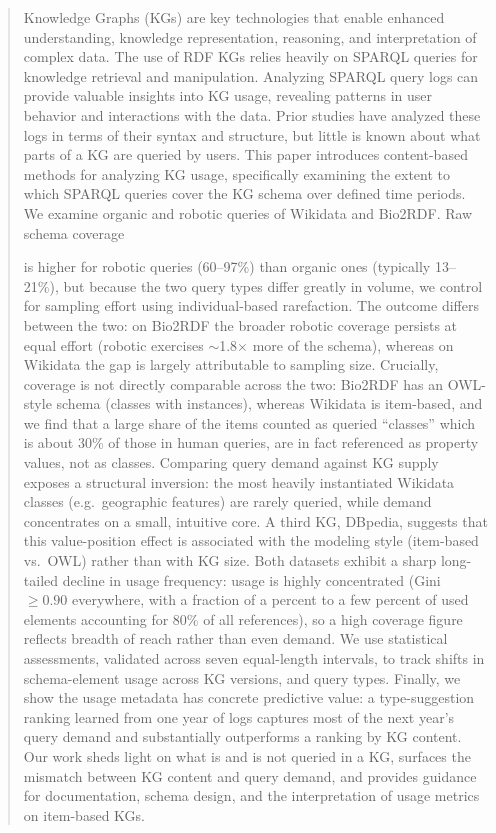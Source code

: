\documentclass[sw]{iosart2x}
\begin{document}
\begin{frontmatter}
\begin{abstract}
Knowledge Graphs (KGs) are key technologies that enable enhanced understanding, knowledge representation, reasoning, and interpretation of complex data. The use of RDF KGs relies heavily on SPARQL queries for knowledge retrieval and manipulation. Analyzing SPARQL query logs can provide valuable insights into KG usage, revealing patterns in user behavior and interactions with the data. Prior studies have analyzed these logs in terms of their syntax and structure, but little is known about what parts of a KG are queried by users. This paper introduces content-based methods for analyzing KG usage, specifically examining the extent to which SPARQL queries cover the KG schema over defined time periods. We examine organic and robotic queries of Wikidata and Bio2RDF. Raw schema coverage

is higher for robotic queries (60--97\%) than organic ones (typically 13--21\%), but because the two query types differ greatly in volume, we control for sampling effort using individual-based rarefaction. The outcome differs between the two: on Bio2RDF the broader robotic coverage persists at equal effort (robotic exercises $\sim$1.8$\times$ more of the schema), whereas on Wikidata the gap is largely attributable to sampling size. Crucially, coverage is not directly comparable across the two: Bio2RDF has an OWL-style schema (classes with instances), whereas Wikidata is item-based, and we find that a large share of the items counted as queried ``classes'' which is about 30\% of those in human queries, are in fact referenced as property values, not as classes. Comparing query demand against KG supply exposes a structural inversion: the most heavily instantiated Wikidata classes (e.g.\ geographic features) are rarely queried, while demand concentrates on a small, intuitive core. A third KG, DBpedia, suggests that this value-position effect is associated with the modeling style (item-based vs.\ OWL) rather than with KG size. Both datasets exhibit a sharp long-tailed decline in usage frequency: usage is highly concentrated (Gini $\geq 0.90$ everywhere, with a fraction of a percent to a few percent of used elements accounting for 80\% of all references), so a high coverage figure reflects breadth of reach rather than even demand. We use statistical assessments, validated across seven equal-length intervals, to track shifts in schema-element usage across KG versions, and query types. Finally, we show the usage metadata has concrete predictive value: a type-suggestion ranking learned from one year of logs captures most of the next year's query demand and substantially outperforms a ranking by KG content. Our work sheds light on what is and is not queried in a KG, surfaces the mismatch between KG content and query demand, and provides guidance for documentation, schema design, and the interpretation of usage metrics on item-based KGs.
\end{abstract}


\end{frontmatter}
\end{document}
